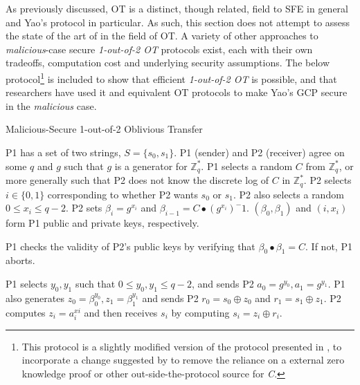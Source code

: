 As previously discussed, \ac{OT} is a distinct, though related, field to \ac{SFE} in general and Yao's protocol in particular.  As such, this section does not attempt to assess the state of the art of in the field of \ac{OT}.  A variety of other approaches to \emph{malicious}-case secure \emph{1-out-of-2 \ac{OT}} protocols exist\cite{naor2001efficient, kiraz2006protocol, goldreich1987play, naor2005computationally}, each with their own tradeoffs, computation cost and underlying security assumptions.  The below protocol\cite{bellare1990non}\footnote{This protocol is a slightly modified version of the protocol presented in \cite{bellare1990non}, to incorporate a change suggested by \cite{naor2001efficient} to remove the reliance on a external zero knowledge proof or other out-side-the-protocol source for \emph{C}.} is included to show that efficient \emph{1-out-of-2 \ac{OT}} is possible, and that researchers have used it and equivalent \ac{OT} protocols to make Yao's \ac{GCP} secure in the \emph{malicious} case.

\begin{algorithm}[H]
    \caption{Malicious-Secure 1-out-of-2 Oblivious Transfer}
    \label{alg:otmalicious}
    \begin{algorithmic}[1]
        \STATE \ac{P1} has a set of two strings, $S = \{s_0, s_1\}$.
        \STATE \ac{P1} (sender) and \ac{P2} (receiver) agree on some $q$ and $g$ such that $g$ is a generator for $\mathbb{Z}^*_q$.
        \STATE \ac{P1} selects a random $C$ from $\mathbb{Z}^*_q$, or more generally such that \ac{P2} does not know the discrete log of $C$ in $\mathbb{Z}^*_q$.
        \STATE \ac{P2} selects $i \in \{0, 1\}$ corresponding to whether \ac{P2} wants $s_0$ or $s_1$. \ac{P2} also selects a random $0 \leq x_i \leq q-2$.
        \STATE \ac{P2} sets $\beta_i = g^{x_i}$ and $\beta_{i-1} = C \bullet (g^{x_i})^-1$. $(\beta_0, \beta_1)$ and $(i, x_i)$ form \ac{P1} public and private keys, respectively.

        \STATE \ac{P1} checks the validity of \ac{P2}'s public keys by verifying that $\beta_0 \bullet \beta_1 = C$.  If not, \ac{P1} aborts.

        \STATE \ac{P1} selects $y_0, y_1$ such that $0 \leq y_0, y_1 \leq q-2$, and sends \ac{P2} $a_0 = g^{y_0}, a_1 = g^{y_1}$.
        \STATE \ac{P1} also generates $z_0 = \beta^{y_0}_0, z_1 = \beta^{y_1}_1$ and sends \ac{P2} $r_0 = s_0 \oplus z_0$ and $r_1 = s_1 \oplus z_1$.
        \STATE \ac{P2} computes $z_i = a^{xi}_i$ and then receives $s_i$ by computing $s_i = z_i \oplus r_i$.
    \end{algorithmic}
\end{algorithm}

